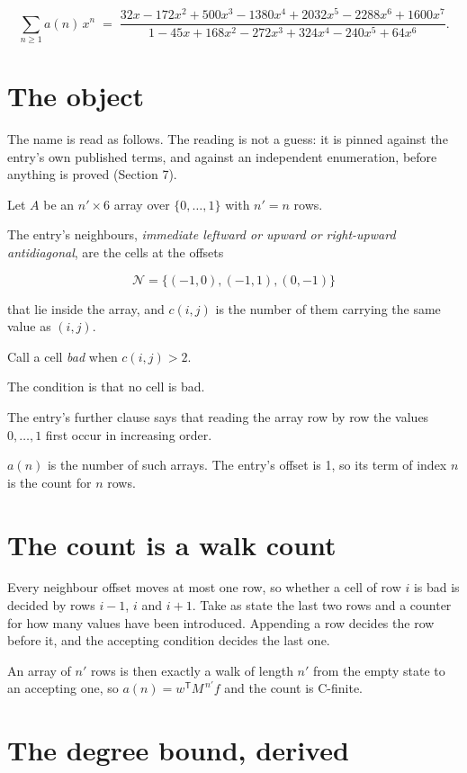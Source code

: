 \documentclass[11pt]{article}
\theoremstyle{definition}
\begin{document}
\[\sum_{n \ge 1} a(n)\,x^n \;=\; \frac{32x - 172x^{2} + 500x^{3} - 1380x^{4} + 2032x^{5} - 2288x^{6} + 1600x^{7}}{1 - 45x + 168x^{2} - 272x^{3} + 324x^{4} - 240x^{5} + 64x^{6}}.\]

\section{The object}

The name is read as follows. The reading is not a guess: it is pinned against the entry's own published terms, and against an independent enumeration, before anything is proved (Section 7).

Let $A$ be an $n' \times 6$ array over $\{0,\dots,1\}$ with $n' = n$ rows.

The entry's neighbours, {\itshape immediate leftward or upward or right-upward antidiagonal}, are the cells at the offsets

\[\mathcal{N} = \{(-1,0), (-1,1), (0,-1)\}\]

that lie inside the array, and $c(i,j)$ is the number of them carrying the same value as $(i,j)$.

Call a cell {\itshape bad} when $c(i,j) > 2$.

The condition is that no cell is bad.

The entry's further clause says that reading the array row by row the values $0,\dots,1$ first occur in increasing order.

$a(n)$ is the number of such arrays. The entry's offset is 1, so its term of index $n$ is the count for $n$ rows.

\section{The count is a walk count}

Every neighbour offset moves at most one row, so whether a cell of row $i$ is bad is decided by rows $i-1$, $i$ and $i+1$. Take as state the last two rows and a counter for how many values have been introduced. Appending a row decides the row before it, and the accepting condition decides the last one.

An array of $n'$ rows is then exactly a walk of length $n'$ from the empty state to an accepting one, so $a(n) = w^{\mathsf T}M^{\,n'}f$ and the count is C-finite.

\section{The degree bound, derived}
\end{document}
